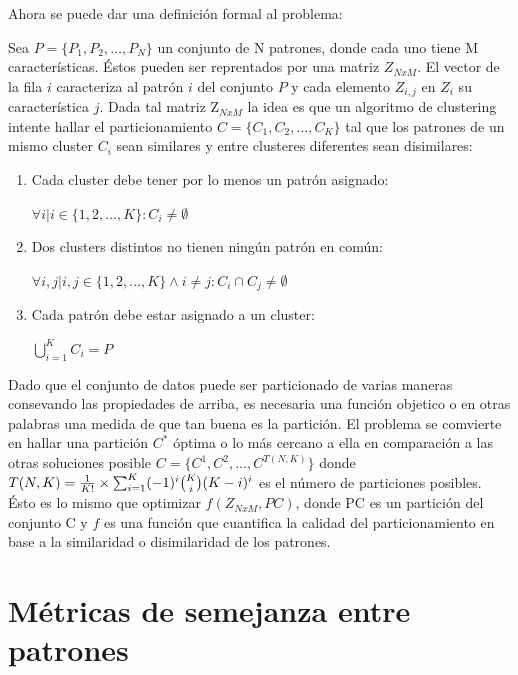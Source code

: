 Ahora se puede dar una definici\'on formal al problema:

Sea $P = \{ P_1, P_2, \dots , P_N\}$ un conjunto de N patrones, 
donde cada uno tiene M caracter\'isticas. Éstos pueden
ser reprentados por una matriz $Z_{NxM}$. El vector de la fila $i$ caracteriza al 
patr\'on $i$ del conjunto $P$ y cada elemento $Z_{i,j}$ en $Z_i$ su caracter\'istica $j$.
Dada tal matriz Z$_{NxM}$ la idea es que un algoritmo de clustering intente hallar
el particionamiento $C = \{ C_1, C_2, \dots , C_K \}$ tal que los patrones
de un mismo cluster $C_i$ sean similares y entre clusteres diferentes
sean disimilares:

\begin{enumerate} \label{en:properties}

\item Cada cluster debe tener por lo menos un patr\'on asignado:

$\forall i | i \in \{1, 2, \dots, K\} : C_i \neq \emptyset$

\item Dos clusters distintos no tienen ning\'un patr\'on en com\'un:

$\forall i,j | i,j\in \{1, 2, \dots, K\} \land i \neq j:  C_i \cap C_j \neq \emptyset$

\item Cada patr\'on debe estar asignado a un cluster:

$\bigcup_{i=1}^{K} C_i = P$

\end{enumerate}

Dado que el conjunto de datos puede ser particionado de varias maneras
consevando las propiedades de arriba, es necesaria una función objetico o en otras palabras
una medida de que tan buena es la partici\'on. El problema se comvierte en hallar
una partici\'on $C^*$  \'optima o lo m\'as cercano a ella en comparaci\'on a 
las otras soluciones posible $C = \{ C^1, C^2, \dots, C^{T(N,K)} \}$ donde 
$T(N,K) = { {1 \over K!} \times {\sum_{i=1}^{K} (-1)^i  \binom{K}{i} (K-i)^i} }$
es el n\'umero de particiones posibles. \'Esto es lo mismo que optimizar $f(Z_{NxM}, PC)$,
donde PC es un partici\'on del conjunto C y $f$ es una funci\'on que
cuantifica la calidad del particionamiento en base a la similaridad o disimilaridad
de los patrones.

\section{M\'etricas de semejanza entre patrones} \label{sect:mdist}

